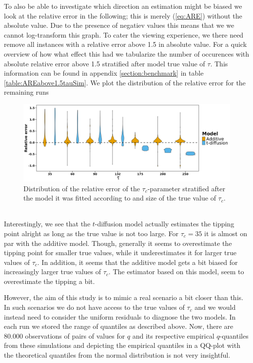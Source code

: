 To also be able to investigate which direction an estimation might be biased we look at the relative error in the following; this is merely (\ref{eq:ARE}) without the absolute value. Due to the presence of negatiev values this means that we we cannot log-transform this graph. To cater the viewing experience, we there need remove all instances with a relative error above 1.5 in absolute value. For a quick overview of how what effect this had we tabularize the number of occurences with absolute relative error above 1.5 stratified after model true value of $\tau$. This information can be found in appendix \ref{section:benchmark} in table \ref{table:AREabove1.5tauSim}. We plot the distribution of the relative error for the remaining runs 
\begin{figure}[h!]
    \begin{center}
    \includegraphics[scale = .075]{figures/RE_dist_tau.jpeg}
    \caption{Distribution of the relative error of the $\tau_c$-parameter stratified after the model it was fitted according to and size of the true value of $\tau_c$.}
    \label{figure:RE_dist_tau}
    \end{center}
\end{figure}\\
Interestingly, we see that the $t$-diffusion model actually estimates the tipping point alright as long as the true value is not too large. For $\tau_c = 35$ it is almost on par with the additive model. Though, generally it seems to overestimate the tipping point for smaller true values, while it underestimates it for larger true values of $\tau_c$. In addition, it seems that the additive model gets a bit biased for increasingly larger true values of $\tau_c$. The estimator based on this model, seem to overestimate the tipping a bit. 

However, the aim of this study is to mimic a real scenario a bit closer than this. In such scenarios we do not have access to the true values of $\tau_c$ and we would instead need to consider the uniform residuals to diagnose the two models. In each run we stored the range of quantiles as described above. Now, there are $80.000$ observations of pairs of values for $q$ and its respective empirical $q$-quantiles from these simulations and depicting the empirical quantiles in a QQ-plot with the theoretical quantiles from the normal distribution is not very insightful.

